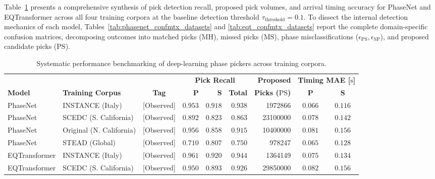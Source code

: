 Table~\ref{tab:picker_dataset_synthesis} presents a comprehensive synthesis of pick detection recall, proposed pick volumes, and arrival timing accuracy for PhaseNet and EQTransformer across all four training corpora at the baseline detection threshold $\tau_{\mathrm{threshold}} = 0.1$. To dissect the internal detection mechanics of each model, Tables~\ref{tab:phasenet_confmtx_datasets} and \ref{tab:eqt_confmtx_datasets} report the complete domain-specific confusion matrices, decomposing outcomes into matched picks ($\mathrm{MH}$), missed picks ($\mathrm{MS}$), phase misclassifications ($\epsilon_{\mathrm{PS}}, \epsilon_{\mathrm{SP}}$), and proposed candidate picks ($\mathrm{PS}$).

\begin{table}[htbp]
  \centering
  \small
  \caption{Systematic performance benchmarking of deep-learning phase pickers across training corpora.}
  \label{tab:picker_dataset_synthesis}
  \begin{threeparttable}
    \begin{tabularx}{\linewidth}{l l c r r r r c c}
      \toprule
      & & & \multicolumn{3}{c}{\textbf{Pick Recall}\tnote{a}} & \textbf{Proposed} & \multicolumn{2}{c}{\textbf{Timing MAE [$\unit{\second}$]}\tnote{b}} \\
      \cmidrule(lr){4-6} \cmidrule(lr){8-9}
      \textbf{Model} & \textbf{Training Corpus} & \textbf{Tag\tnote{c}} & \textbf{P} & \textbf{S} & \textbf{Total} & \textbf{Picks ($\mathrm{PS}$)} & \textbf{P} & \textbf{S} \\
      \midrule
      PhaseNet & INSTANCE (Italy) & [Observed] & $\mathbf{0.953}$ & $\mathbf{0.918}$ & $\mathbf{0.938}$ & \num{1972866} & $\mathbf{0.066}$ & $\mathbf{0.116}$ \\
      PhaseNet & SCEDC (S. California) & [Observed] & $0.892$ & $0.823$ & $0.863$ & \num{23100000} & $0.078$ & $0.142$ \\
      PhaseNet & Original (N. California) & [Observed] & $0.956$ & $0.858$ & $0.915$ & \num{10400000} & $0.081$ & $0.156$ \\
      PhaseNet & STEAD (Global) & [Observed] & $0.710$ & $0.807$ & $0.750$ & \num{978247} & $0.065$ & $0.128$ \\
      \midrule
      EQTransformer & INSTANCE (Italy) & [Observed] & $\mathbf{0.961}$ & $\mathbf{0.920}$ & $\mathbf{0.944}$ & \num{1364149} & $0.075$ & $0.134$ \\
      EQTransformer & SCEDC (S. California) & [Observed] & $0.950$ & $0.893$ & $0.926$ & \num{29850000} & $0.082$ & $0.156$ \\

\end{tabularx}
\end{threeparttable}
\end{table}
